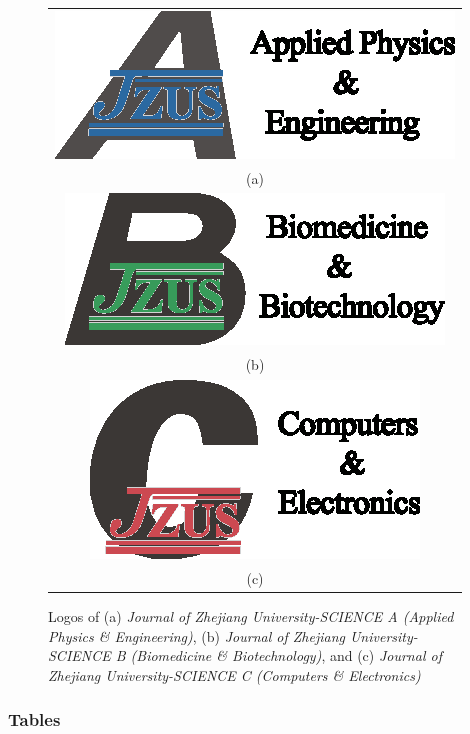 \documentclass[twoside,twocolumn]{article}
\begin{document}
\begin{figure}[!htb]\small
\centering
\begin{tabular}{c}
	\includegraphics[scale=0.9]{pics/jzusalogo.eps}\\
	{\footnotesize\sf (a)} \\
	\includegraphics[scale=0.9]{pics/jzusblogo.eps}\\
	{\footnotesize\sf (b)} \\
	\includegraphics[scale=0.9]{pics/jzusclogo.eps}\\
	{\footnotesize\sf (c)} \\
\end{tabular}
\caption{Logos of (a) \emph{Journal of Zhejiang University-SCIENCE A (Applied Physics {\sf \slshape \&} Engineering)}, (b) \emph{Journal of Zhejiang University-SCIENCE B (Biomedicine {\sf \slshape \&} Biotechnology)}, and (c) \emph{Journal of Zhejiang University-SCIENCE C (Computers {\sf \slshape \&} Electronics)}}
\label{fig:logo}
\end{figure}


\subsubsection{Tables}\label{sec:table}
\end{document}
